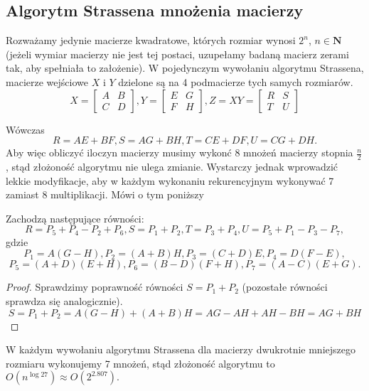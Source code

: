 \subsection{Algorytm Strassena mnożenia macierzy}
Rozważamy jedynie macierze kwadratowe, których rozmiar wynosi $2^n$, $n \in
\mathbf{N}$ (jeżeli wymiar macierzy nie jest tej postaci, uzupełamy badaną
macierz zerami tak, aby spełniała to założenie). W pojedynczym wywołaniu
algorytmu Strassena, macierze wejściowe $X$ i $Y$ dzielone są na 4 podmacierze
tych samych rozmiarów.
$$X=\begin{bmatrix} A & B \\ C & D \end{bmatrix},	
Y=\begin{bmatrix} E & G \\ F & H \end{bmatrix},		
Z=XY=\begin{bmatrix} R & S \\ T & U \end{bmatrix}$$

Wówczas
$$ R=AE+BF, S=AG+BH, T=CE+DF, U=CG+DH.$$
Aby więc obliczyć iloczyn macierzy musimy wykonć 8 mnożeń macierzy stopnia
$\frac{n}{2}$, stąd złożoność algorytmu nie ulega zmianie. Wystarczy jednak
wprowadzić lekkie modyfikacje, aby  w każdym wykonaniu rekurencyjnym wykonywać
7 zamiast 8 multiplikacji. Mówi o tym poniższy
\begin{lm}{Zachodzą następujące równości:
$$R=P_5+P_4-P_2+P_6, S=P_1+P_2, T=P_3+P_4, U=P_5+P_1-P_3-P_7,$$
gdzie
$$P_1=A(G-H), P_2=(A+B)H, P_3=(C+D)E, P_4=D(F-E),$$
$$P_5=(A+D)(E+H), P_6=(B-D)(F+H), P_7 = (A-C)(E+G).$$}
\end{lm}
\begin{proof}
Sprawdzimy poprawność równości $S=P_1+P_2$ (pozostałe równości sprawdza się
analogicznie).
$$S=P_1+P_2=A(G-H)+(A+B)H=AG-AH+AH-BH=AG+BH$$
\end{proof}
W każdym wywołaniu algorytmu Strassena dla macierzy dwukrotnie mniejszego
rozmiaru wykonujemy 7 mnożeń, stąd złożoność algorytmu to $O(n^{\log{2}{7}})
\approx O(2^{2.807}).$
